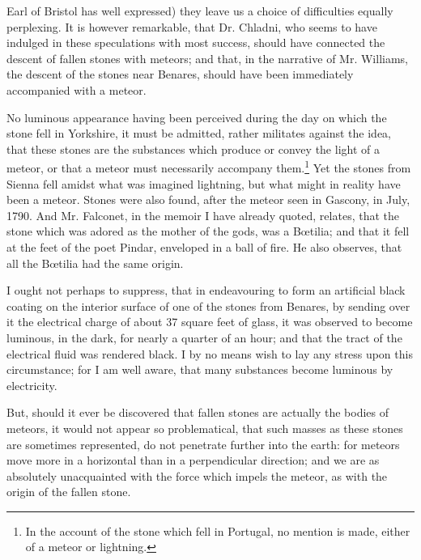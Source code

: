 \documentclass[a4paper, 12pt, oneside, twocolumn]{article}
\begin{document}
Earl of Bristol has well expressed) they leave us a choice of difficulties equally perplexing. It is however remarkable, that Dr. Chladni, who seems to have indulged in these speculations with most success, should have connected the descent of fallen stones with meteors; and that, in the narrative of Mr. Williams, the descent of the stones near Benares, should have been immediately accompanied with a meteor.

No luminous appearance having been perceived during the day on which the stone fell in Yorkshire, it must be admitted, rather militates against the idea, that these stones are the substances which produce or convey the light of a meteor, or that a meteor must necessarily accompany them.\footnote{In the account of the stone which fell in Portugal, no mention is made, either of a meteor or lightning.} Yet the stones from Sienna fell amidst what was imagined lightning, but what might in reality have been a meteor. Stones were also found, after the meteor seen in Gascony, in July, 1790. And Mr. Falconet, in the memoir I have already quoted, relates, that the stone which was adored as the mother of the gods, was a Bœtilia; and that it fell at the feet of the poet Pindar, enveloped in a ball of fire. He also observes, that all the Bœtilia had the same origin.

I ought not perhaps to suppress, that in endeavouring to form an artificial black coating on the interior surface of one of the stones from Benares, by sending over it the electrical charge of about 37 square feet of glass, it was observed to become luminous, in the dark, for nearly a quarter of an hour; and that the tract of the electrical fluid was rendered black. I by no means wish to lay any stress upon this circumstance; for I am well aware, that many substances become luminous by electricity.

But, should it ever be discovered that fallen stones are actually the bodies of meteors, it would not appear so problematical, that such masses as these stones are sometimes represented, do not penetrate further into the earth: for meteors move more in a horizontal than in a perpendicular direction; and we are as absolutely unacquainted with the force which impels the meteor, as with the origin of the fallen stone.
\end{document}

